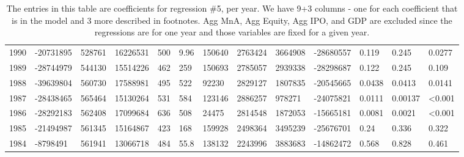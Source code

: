 \begin{table}[ht]
\begin{tabular}{rllllllllllll}
  1990 & -20731895 & 528761 & 16226531 & 500 & 9.96 & 150640 & 2763424 & 3664908 & -28680557 & 0.119 & 0.245 & 0.0277 \\ 
  1989 & -28744979 & 544130 & 15514226 & 462 & 259 & 150693 & 2785057 & 2939338 & -28298687 & 0.122 & 0.245 & 0.109 \\ 
  1988 & -39639804 & 560730 & 17588981 & 495 & 522 & 92230 & 2829127 & 1807835 & -20545665 & 0.0438 & 0.0413 & 0.0141 \\ 
  1987 & -28438465 & 565464 & 15130264 & 531 & 584 & 123146 & 2886257 & 978271 & -24075821 & 0.0111 & 0.00137 & \textless 0.001 \\ 
  1986 & -28292183 & 562408 & 17099684 & 636 & 508 & 24475 & 2814548 & 1872053 & -15665181 & 0.0081 & 0.0021 & \textless 0.001 \\ 
  1985 & -21494987 & 561345 & 15164867 & 423 & 168 & 159928 & 2498364 & 3495239 & -25676701 & 0.24 & 0.336 & 0.322 \\ 
  1984 & -8798491 & 561941 & 13066718 & 484 & 55.8 & 138132 & 2243996 & 3883683 & -14862472 & 0.568 & 0.828 & 0.461 \\ 
   \hline
\end{tabular}
\caption{The entries in this table are coefficients for regression \#5, per year. 
                  We have 9+3 columns - one for each coefficient that is in the model and 3 more described in footnotes.
                  Agg MnA, Agg Equity, Agg IPO, and GDP are excluded since the regressions are for one year and those 
                  variables are fixed for a given year.} 
\end{table}
